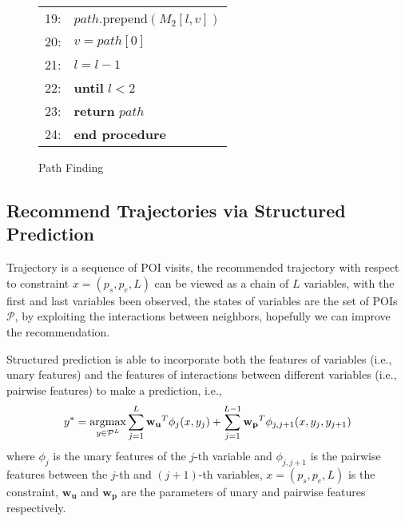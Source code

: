 \begin{figure}
\begin{tabular}{p{3pt}l}
19:&\hspace{20pt}     $path$.prepend$(M_2[l, v])$ \\
20:&\hspace{20pt}     $v = path[0]$ \\
21:&\hspace{20pt}     $l = l - 1$ \\
22:&\hspace{10pt} \textbf{until} $l < 2$ \\
23:&\hspace{10pt} \textbf{return} $path$ \\
24:&\textbf{end procedure} \\
\end{tabular}
\caption{Path Finding}
\label{fig:path}
\end{figure}


\subsection{Recommend Trajectories via Structured Prediction}
\label{method:structured}
Trajectory is a sequence of POI visits,
the recommended trajectory with respect to constraint $x = (p_s, p_e, L)$ can be viewed as a chain of $L$ variables, 
with the first and last variables been observed, the states of variables are the set of POIs $\mathcal{P}$,
by exploiting the interactions between neighbors, hopefully we can improve the recommendation.

Structured prediction is able to incorporate both the features of variables (i.e., unary features) and 
the features of interactions between different variables (i.e., pairwise features) to make a prediction, i.e.,
\begin{displaymath}
    y^* = \operatorname*{argmax}_{y \in \mathcal{P}^L} \sum_{j=1}^L \mathbf{w_u}^T \phi_j(x, y_j) + 
                                        \sum_{j=1}^{L-1} \mathbf{w_p}^T \phi_{j, j+1}(x, y_j, y_{j+1})
\end{displaymath}
where $\phi_j$ is the unary features of the $j$-th variable and $\phi_{j, j+1}$ is the pairwise features between
the $j$-th and $(j+1)$-th variables, $x = (p_s, p_e, L)$ is the constraint, $\mathbf{w_u}$ and $\mathbf{w_p}$ are the 
parameters of unary and pairwise features respectively.

